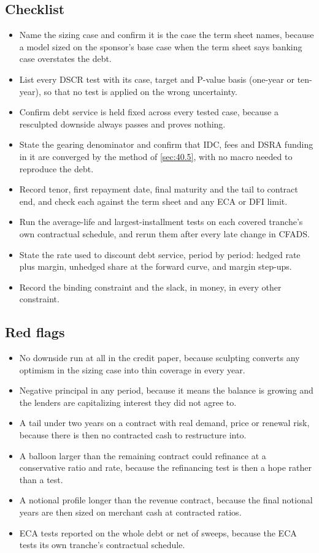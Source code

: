 \subsection*{Checklist}
\begin{itemize}
\item Name the sizing case and confirm it is the case the term sheet names, because a model sized on the sponsor's base case when the term sheet says banking case overstates the debt.
\item List every DSCR test with its case, target and P-value basis (one-year or ten-year), so that no test is applied on the wrong uncertainty.
\item Confirm debt service is held fixed across every tested case, because a resculpted downside always passes and proves nothing.
\item State the gearing denominator and confirm that IDC, fees and DSRA funding in it are converged by the method of \cref{sec:40.5}, with no macro needed to reproduce the debt.
\item Record tenor, first repayment date, final maturity and the tail to contract end, and check each against the term sheet and any ECA or DFI limit.
\item Run the average-life and largest-installment tests on each covered tranche's own contractual schedule, and rerun them after every late change in CFADS.
\item State the rate used to discount debt service, period by period: hedged rate plus margin, unhedged share at the forward curve, and margin step-ups.
\item Record the binding constraint and the slack, in money, in every other constraint.
\end{itemize}

\subsection*{Red flags}
\begin{itemize}
\item No downside run at all in the credit paper, because sculpting converts any optimism in the sizing case into thin coverage in every year.
\item Negative principal in any period, because it means the balance is growing and the lenders are capitalizing interest they did not agree to.
\item A tail under two years on a contract with real demand, price or renewal risk, because there is then no contracted cash to restructure into.
\item A balloon larger than the remaining contract could refinance at a conservative ratio and rate, because the refinancing test is then a hope rather than a test.
\item A notional profile longer than the revenue contract, because the final notional years are then sized on merchant cash at contracted ratios.
\item ECA tests reported on the whole debt or net of sweeps, because the ECA tests its own tranche's contractual schedule.
\end{itemize}

